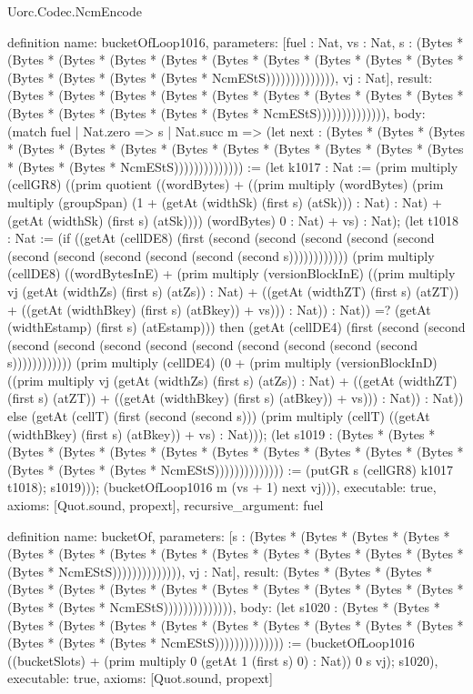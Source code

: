 \begin{lexlean}{Uorc.Codec.NcmEncode}
\begin{semanticmodule}
definition{
  name: bucketOfLoop1016,
  parameters: [fuel : Nat, vs : Nat, s : (Bytes * (Bytes * (Bytes * (Bytes * (Bytes * (Bytes * (Bytes * (Bytes * (Bytes * (Bytes * (Bytes * (Bytes * (Bytes * (Bytes * NcmEStS)))))))))))))), vj : Nat],
  result: (Bytes * (Bytes * (Bytes * (Bytes * (Bytes * (Bytes * (Bytes * (Bytes * (Bytes * (Bytes * (Bytes * (Bytes * (Bytes * (Bytes * NcmEStS)))))))))))))),
  body: (match fuel
    | Nat.zero => s
    | Nat.succ m => (let next : (Bytes * (Bytes * (Bytes * (Bytes * (Bytes * (Bytes * (Bytes * (Bytes * (Bytes * (Bytes * (Bytes * (Bytes * (Bytes * (Bytes * NcmEStS)))))))))))))) := (let k1017 : Nat := (prim multiply (cellGR8) ((prim quotient ((wordBytes) + ((prim multiply (wordBytes) (prim multiply (groupSpan) (1 + (getAt (widthSk) (first s) (atSk))) : Nat) : Nat) + (getAt (widthSk) (first s) (atSk)))) (wordBytes) 0 : Nat) + vs) : Nat); (let t1018 : Nat := (if ((getAt (cellDE8) (first (second (second (second (second (second (second (second (second (second (second (second s)))))))))))) (prim multiply (cellDE8) ((wordBytesInE) + (prim multiply (versionBlockInE) ((prim multiply vj (getAt (widthZs) (first s) (atZs)) : Nat) + ((getAt (widthZT) (first s) (atZT)) + ((getAt (widthBkey) (first s) (atBkey)) + vs))) : Nat)) : Nat)) =? (getAt (widthEstamp) (first s) (atEstamp))) then (getAt (cellDE4) (first (second (second (second (second (second (second (second (second (second (second (second s)))))))))))) (prim multiply (cellDE4) (0 + (prim multiply (versionBlockInD) ((prim multiply vj (getAt (widthZs) (first s) (atZs)) : Nat) + ((getAt (widthZT) (first s) (atZT)) + ((getAt (widthBkey) (first s) (atBkey)) + vs))) : Nat)) : Nat)) else (getAt (cellT) (first (second (second s))) (prim multiply (cellT) ((getAt (widthBkey) (first s) (atBkey)) + vs) : Nat))); (let s1019 : (Bytes * (Bytes * (Bytes * (Bytes * (Bytes * (Bytes * (Bytes * (Bytes * (Bytes * (Bytes * (Bytes * (Bytes * (Bytes * (Bytes * NcmEStS)))))))))))))) := (putGR s (cellGR8) k1017 t1018); s1019))); (bucketOfLoop1016 m (vs + 1) next vj))),
  executable: true,
  axioms: [Quot.sound, propext],
  recursive_argument: fuel
}

definition{
  name: bucketOf,
  parameters: [s : (Bytes * (Bytes * (Bytes * (Bytes * (Bytes * (Bytes * (Bytes * (Bytes * (Bytes * (Bytes * (Bytes * (Bytes * (Bytes * (Bytes * NcmEStS)))))))))))))), vj : Nat],
  result: (Bytes * (Bytes * (Bytes * (Bytes * (Bytes * (Bytes * (Bytes * (Bytes * (Bytes * (Bytes * (Bytes * (Bytes * (Bytes * (Bytes * NcmEStS)))))))))))))),
  body: (let s1020 : (Bytes * (Bytes * (Bytes * (Bytes * (Bytes * (Bytes * (Bytes * (Bytes * (Bytes * (Bytes * (Bytes * (Bytes * (Bytes * (Bytes * NcmEStS)))))))))))))) := (bucketOfLoop1016 ((bucketSlots) + (prim multiply 0 (getAt 1 (first s) 0) : Nat)) 0 s vj); s1020),
  executable: true,
  axioms: [Quot.sound, propext]
}


\end{semanticmodule}
\end{lexlean}

